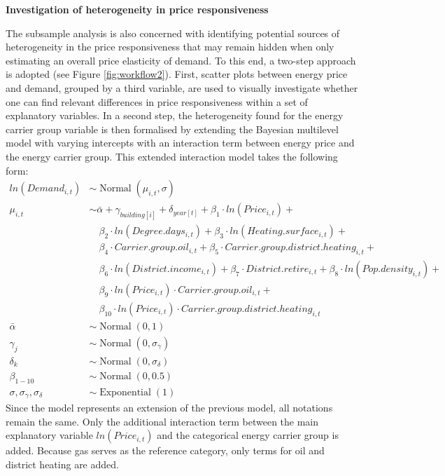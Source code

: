 \documentclass[12pt,twoside]{reedthesis}
\begin{document}
\textbf{Investigation of heterogeneity in price responsiveness}

The subsample analysis is also concerned with identifying potential sources of heterogeneity in the price responsiveness that may remain hidden when only estimating an overall price elasticity of demand. To this end, a two-step approach is adopted (see Figure \ref{fig:workflow2}). First, scatter plots between energy price and demand, grouped by a third variable, are used to visually investigate whether one can find relevant differences in price responsiveness within a set of explanatory variables. In a second step, the heterogeneity found for the energy carrier group variable is then formalised by extending the Bayesian multilevel model with varying intercepts with an interaction term between energy price and the energy carrier group. This extended interaction model takes the following form:
\begin{align*}
ln(Demand_{i,t}) & \sim \operatorname{Normal}(\mu_{i,t}, \sigma) \\
\mu_{i,t} & \sim \bar\alpha + \gamma_{building[i]} + \delta_{year[t]} + \beta_1 \cdot ln(Price_{i,t}) +  \\
 & \quad \beta_{2} \cdot ln(Degree.days_{i,t}) + \beta_{3} \cdot ln(Heating.surface_{i,t}) + \\
 & \quad \beta_{4} \cdot Carrier.group.oil_{i,t} + \beta_{5} \cdot Carrier.group.district.heating_{i,t} + \\
 & \quad \beta_{6} \cdot ln(District.income_{i,t}) + \beta_{7} \cdot District.retire_{i,t} + \beta_{8} \cdot ln(Pop.density_{i,t}) + \\
 & \quad \beta_{9} \cdot ln(Price_{i,t}) \cdot Carrier.group.oil_{i,t} + \\
 & \quad \beta_{10} \cdot ln(Price_{i,t}) \cdot Carrier.group.district.heating_{i,t} \\
\bar\alpha & \sim \operatorname{Normal}(0, 1) \\
\gamma_j & \sim \operatorname{Normal}(0, \sigma_{\gamma}) \\
\delta_k & \sim \operatorname{Normal}(0, \sigma_{\delta}) \\
\beta_{1-10} & \sim \operatorname{Normal}(0, 0.5) \\
\sigma, \sigma_{\gamma}, \sigma_{\delta} & \sim \operatorname{Exponential}(1)
\end{align*}
Since the model represents an extension of the previous model, all notations remain the same. Only the additional interaction term between the main explanatory variable \(ln(Price_{i,t})\) and the categorical energy carrier group is added. Because gas serves as the reference category, only terms for oil and district heating are added.
\end{document}
